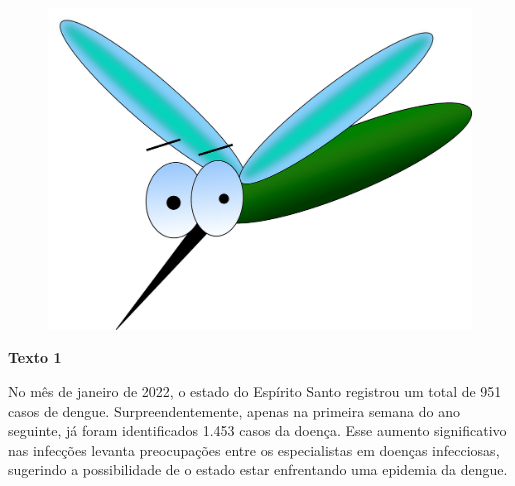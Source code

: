 \begin{myquote}





\begin{figure}[H]
\centering
\includegraphics[scale=0.25]{./imgSAEB_7_POR/media/image32.png}
\end{figure}

\textbf{Texto 1}

No mês de janeiro de 2022, o estado do Espírito Santo registrou um
total de 951 casos de dengue. Surpreendentemente, apenas na primeira semana do
ano seguinte, já foram identificados 1.453 casos da doença. Esse aumento
significativo nas infecções levanta preocupações entre os especialistas em
doenças infecciosas, sugerindo a possibilidade de o estado estar enfrentando
uma epidemia da dengue.


\end{myquote}
